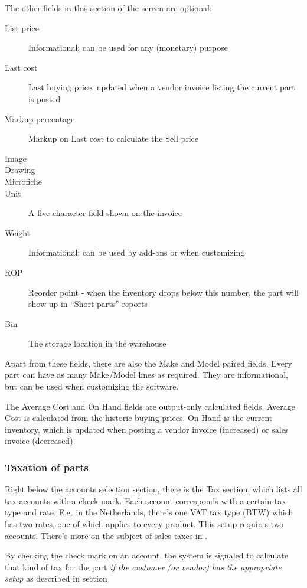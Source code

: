 The other fields in this section of the screen are optional:

\begin{description}
\item [List price] Informational; can be used for any (monetary) purpose
\item [Last cost] Last buying price, updated when a vendor invoice listing the current part
    is posted
\item [Markup percentage] Markup on Last cost to calculate the Sell price
\item [Image]
\item [Drawing]
\item [Microfiche]
\item [Unit] A five-character field shown on the invoice
\item [Weight] Informational; can be used by \glspl{add-on} or when customizing
\item [ROP] Reorder point - when the inventory drops below this number,
     the part will show up in ``Short parts'' reports
\item [Bin] The storage location in the warehouse
\end{description}


Apart from these fields, there are also the Make and Model paired fields. Every part
can have as many Make/Model lines as required. They are informational, but can be used
when customizing the software.

The Average Cost and On Hand fields are output-only calculated fields. Average Cost is
calculated from the historic buying prices. On Hand is the current inventory, which is
updated when posting a vendor invoice (increased) or sales invoice (decreased).



\subsubsection{Taxation of parts}
\label{subsubsec-products-parts-taxation}

Right below the accounts selection section, there is the Tax section, which lists
all tax accounts with a check mark. Each account corresponds with a certain tax type
and rate. E.g. in the Netherlands, there's one VAT tax type (BTW) which has two rates,
one of which applies to every product. This setup requires two accounts. There's more
on the subject of sales taxes in .

By checking the check mark on an account, the system is signaled to calculate that
kind of tax for the part {\it if the customer (or vendor) has the appropriate setup}
as described in section


